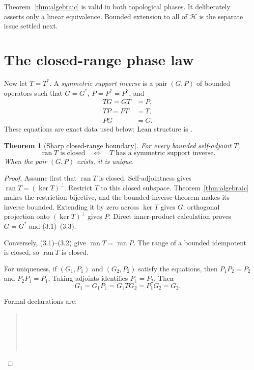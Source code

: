 \documentclass[11pt]{article}
\newtheorem{theorem}{Theorem}[section]
\theoremstyle{definition}
\theoremstyle{remark}
\newcommand{\Hh}{\mathcal H}
\newcommand{\ran}{\operatorname{ran}}
\newcommand{\kerop}{\operatorname{ker}}
\begin{document}
Theorem~\ref{thm:algebraic} is valid in both topological phases.  It deliberately asserts only a
linear equivalence.  Bounded extension to all of $\Hh$ is the separate issue settled next.

\section{The closed-range phase law}

Now let $T=T^*$.  A \emph{symmetric support inverse} is a pair $(G,P)$ of bounded operators such
that $G=G^*$, $P=P^*=P^2$, and
\begin{align}
 TG=GT&=P,                                                \tag{3.1}\\
 TP=PT&=T,                                                \tag{3.2}\\
 PG&=G.                                                   \tag{3.3}
\end{align}
These equations are exact data used below; Lean structure is
.

\begin{theorem}[Sharp closed-range boundary]
\label{thm:closed}
For every bounded self-adjoint $T$,
\[
 \ran T\text{ is closed}
 \quad\Longleftrightarrow\quad
 T\text{ has a symmetric support inverse}.               \tag{3.4}
\]
When the pair $(G,P)$ exists, it is unique.
\end{theorem}

\begin{proof}
Assume first that $\ran T$ is closed.  Self-adjointness gives
$\ran T=(\kerop T)^\perp$.  Restrict $T$ to this closed subspace.  Theorem~\ref{thm:algebraic}
makes the restriction bijective, and the bounded inverse theorem makes its inverse bounded.
Extending it by zero across $\kerop T$ gives $G$; orthogonal projection onto
$(\kerop T)^\perp$ gives $P$.  Direct inner-product calculation proves $G=G^*$ and
(3.1)--(3.3).

Conversely, (3.1)--(3.2) give $\ran T=\ran P$.  The range of a bounded idempotent is closed, so
$\ran T$ is closed.

For uniqueness, if $(G_1,P_1)$ and $(G_2,P_2)$ satisfy the equations, then
$P_1P_2=P_2$ and $P_2P_1=P_1$.  Taking adjoints identifies $P_1=P_2$.  Then
\[
 G_1=G_1P_1=G_1TG_2=P_1G_2=G_2.                         \tag{3.5}
\]

Formal declarations are:
\begin{quote}\footnotesize
{}\\
\\
\\
\\
\end{quote}
\end{proof}
\end{document}
